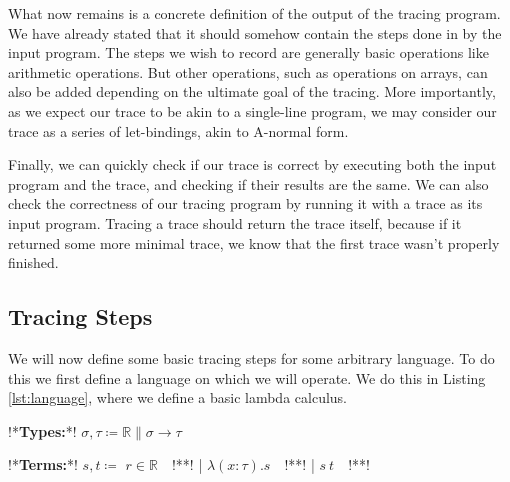     What now remains is a concrete definition of the output of the tracing program.
    We have already stated that it should somehow contain the steps done in by the input program.
    The steps we wish to record are generally basic operations like arithmetic operations.
    But other operations, such as operations on arrays, can also be added depending on the ultimate goal of the tracing.
    More importantly, as we expect our trace to be akin to a single-line program, we may consider our trace as a series of let-bindings, akin to A-normal form\cn.
    
    Finally, we can quickly check if our trace is correct by executing both the input program and the trace, and checking if their results are the same.
    We can also check the correctness of our tracing program by running it with a trace as its input program.
    Tracing a trace should return the trace itself, because if it returned some more minimal trace, we know that the first trace wasn't properly finished.

    \subsection{Tracing Steps} \label{sec:steps}
        We will now define some basic tracing steps for some arbitrary language.
        To do this we first define a language on which we will operate.
        We do this in Listing \ref{lst:language}, where we define a basic lambda calculus.

        \begin{quicklst}[caption=Basic language, label=lst:language, gobble=12]
            !*\textbf{Types:}*!
                $\sigma,\tau\coloneqq\mathbb{R}\|\sigma\to\tau$

            !*\textbf{Terms:}*!
                $s,t\coloneqq$
                    $r\in\mathbb{R}\quad$!**!
                  | $\lambda(x:\tau).s\quad$!**!
                  | $s\ t\quad$!**!
        \end{quicklst}

